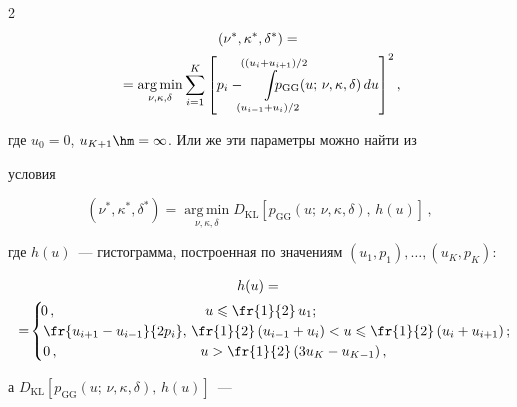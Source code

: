 \begin{multicols}{2}
\begin{multline*}


\left(\nu^*,\kappa^*,\delta^*\right)={}\\


{}=


\mathop{\mathrm{arg\,min}}\limits_{\nu,\kappa,\delta}


\sum\limits_{i=1}^K\left[p_i-\hspace*{-2mm}


\int\limits_{(u_{i-1}+u_i)/2}^{((u_i+u_{i+1})/2}\hspace*{-8mm}p_{\mathrm{GG}}


(u;\,\nu,\kappa,\delta)\,du\right]^2,


\end{multline*}


где $u_0=0$, $u_{K+1}\hm=\infty$. Или же эти параметры можно найти из


условия


$$


(\nu^*,\kappa^*,\delta^*)=\mathop{\mathrm{arg\,min}}\limits_{\nu,\kappa,\delta}D_{\mathrm{KL}}


\left[p_{\mathrm{GG}}(u;\,\nu,\kappa,\delta),\,h(u)\right]\,,


$$


где $h(u)$~--- гистограмма, построенная по значениям $(u_1, p_1),\ldots, (u_K,


p_K)$:


\begin{multline*}


h(u)={}\\


\!\!{}=\!\begin{cases}\!


0\,, &\  u\leqslant\fr{1}{2}\,u_1;\\


\fr{u_{i+1}-u_{i-1}}{2p_i}, &\!\!\! \!\fr{1}{2}\left(u_{i-1}+u_i\right)<


u\leqslant\fr{1}{2}\left(u_{i}+u_{i+1}\right);\hspace*{-6.32454pt}\\ 


0\,, & u>\fr{1}{2}\left(3u_{K}-u_{K-1}\right),


\end{cases}\!


\end{multline*}


 а $D_{\mathrm{KL}}\left[p_{\mathrm{GG}}(u;\,\nu,\kappa,\delta),\,h(u)\right]$~---



\end{multicols}
